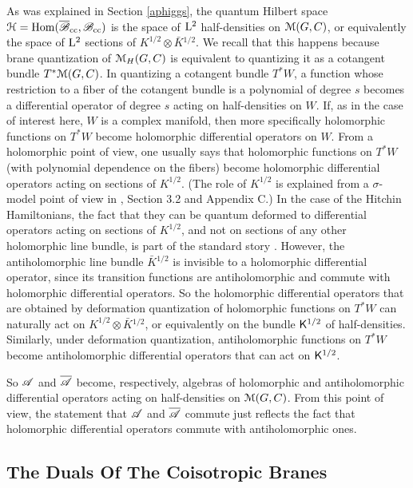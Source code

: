\documentclass[11pt,a4paper]{article}
\begin{document}
As was explained in Section \ref{aphiggs}, the quantum Hilbert space  ${\mathcal H}={\mathrm{Hom}}(\overline{{\mathscr B}}_{\mathrm{cc}},{\mathscr B}_{\mathrm{cc}})$ is the space of 
${\mathrm L}^2$ half-densities on ${\mathcal M}(G,C)$,  or equivalently the space of ${\mathrm L}^2$ sections of $K^{1/2}\otimes \bar K{}^{1/2}$.
We recall that this  happens because brane quantization of ${\mathcal M}_H(G,C)$ is equivalent to quantizing it as a cotangent bundle $T^*{\mathcal M}(G,C)$.   In quantizing a cotangent bundle $T^*W$, a function whose restriction to a fiber of the cotangent bundle is a polynomial of degree $s$
becomes a differential operator of degree $s$ acting on half-densities on $W$.   If, as in the case of interest here, $W$ is a complex manifold, then more
specifically holomorphic functions on $T^*W$ become holomorphic differential operators on $W$.  From a holomorphic point of view, one usually says
that holomorphic functions on $T^*W$ (with polynomial dependence on the fibers) become holomorphic differential operators acting on sections of $K^{1/2}$.
(The role of $K^{1/2}$ is explained from a $\sigma$-model point of view in \cite{GW}, Section 3.2 and Appendix C.)  
In the case of the Hitchin Hamiltonians, the fact that they can be quantum deformed to differential operators acting on sections of $K^{1/2}$, and not on
sections of any other holomorphic line bundle, is part of the standard story \cite{H2,BD}.
 However, the antiholomorphic line bundle $\bar K{}^{1/2}$ is invisible
to a holomorphic differential operator, since its transition functions are antiholomorphic and commute with holomorphic differential operators.   So the holomorphic
differential operators that are obtained by deformation quantization of holomorphic functions on $T^*W$ can naturally act on $K^{1/2}\otimes \bar K{}^{1/2}$,
or equivalently on the bundle ${\sf K}^{1/2}$ of half-densities.  Similarly, under deformation quantization, antiholomorphic functions on $T^*W$ become
antiholomorphic differential operators that can act on ${\sf K}^{1/2}$.




 

So ${\mathscr A}$ and $\overline{\mathscr A}$ become, respectively, algebras of holomorphic and antiholomorphic differential operators acting on half-densities on ${\mathcal M}(G,C)$.
From this point of view, the statement that ${\mathscr A}$ and $\overline{\mathscr A}$ commute just reflects the fact that holomorphic differential operators commute with antiholomorphic ones.


\subsection{The Duals Of The Coisotropic Branes}\label{dualco}
\end{document}
